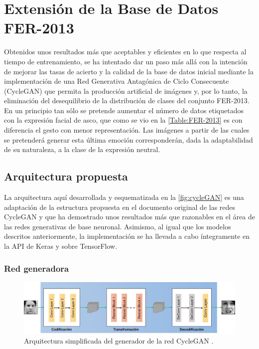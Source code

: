 \chapter{Extensión de la Base de Datos FER-2013 } \label{Chapter:6}

Obtenidos unos resultados más que aceptables y eficientes en lo que respecta al tiempo de entrenamiento, se ha intentado dar un paso más allá con la intención de mejorar las tasas de acierto y la calidad de la base de datos inicial mediante la implementación de una Red Generativa Antagónica de Ciclo Consecuente (CycleGAN) \cite{cycleGAN} que permita la producción artificial de imágenes y, por lo tanto, la eliminación del desequilibrio de la distribución de clases del conjunto FER-2013. En un principio tan sólo se pretende aumentar el número de datos etiquetados con la expresión facial de asco, que como se vio en la \autoref{Table:FER-2013} es con diferencia el gesto con menor representación. Las imágenes a partir de las cuales se pretenderá generar esta última emoción corresponderán, dada la adaptabilidad de su naturaleza, a la clase de la expresión neutral.

\section{Arquitectura propuesta}

La arquitectura aquí desarrollada y esquematizada en la \autoref{fig:cycleGAN} es una adaptación de la estructura propuesta en el documento original de las redes CycleGAN y que ha demostrado unos resultados más que razonables en el área de las redes generativas de base neuronal. Asimismo, al igual que los modelos descritos anteriormente, la implementación se ha llevada a cabo íntegramente en la API de Keras y sobre TensorFlow.

\subsection{Red generadora}

\begin{figure}
  \centering
  \includegraphics[width=\textwidth]{Images/Generator.png}
  \caption{Arquitectura simplificada del generador de la red CycleGAN \cite{img:CycleGAN}.}
  \label{fig:Generator}
\end{figure}

